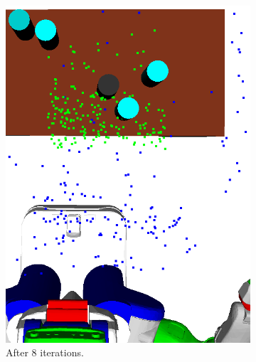 \begin{figure}[t]
\begin{subfigure}[b]{0.35\linewidth}
    \includegraphics[width=\textwidth]{images/learn8.png}
    \caption{After 8 iterations.}
  \end{subfigure}
  \begin{subfigure}[b]{0.35\linewidth}

\end{subfigure}
\end{figure}
